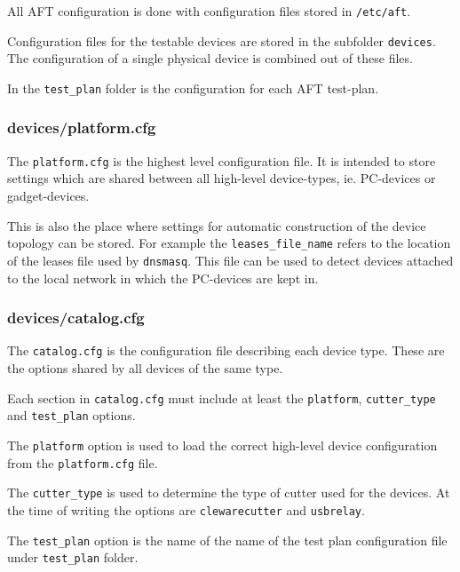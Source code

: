 \documentclass[a4paper,11pt]{article}
\newcommand{\cmd}[1]{\texttt{#1}}
\begin{document}
All AFT configuration is done with configuration files stored in \cmd{/etc/aft}.

Configuration files for the testable devices are stored in the subfolder \cmd{devices}. The configuration of a single physical device is combined out of these files.

In the \cmd{test\_plan} folder is the configuration for each AFT test-plan.

\subsubsection*{devices/platform.cfg}
The \cmd{platform.cfg} is the highest level configuration file. It is intended to store settings which are shared between all high-level device-types, ie. PC-devices or gadget-devices.

This is also the place where settings for automatic construction of the device topology can be stored. For example the \cmd{leases\_file\_name} refers to the location of the leases file used by \cmd{dnsmasq}. This file can be used to detect devices attached to the local network in which the PC-devices are kept in.

\subsubsection*{devices/catalog.cfg}
The \cmd{catalog.cfg} is the configuration file describing each device type. These are the options shared by all devices of the same type.

Each section in \cmd{catalog.cfg} must include at least the \cmd{platform}, \cmd{cutter\_type} and \cmd{test\_plan} options.

The \cmd{platform} option is used to load the correct high-level device configuration from the \cmd{platform.cfg} file. 

The \cmd{cutter\_type} is used to determine the type of cutter used for the devices. At the time of writing the options are \cmd{clewarecutter} and \cmd{usbrelay}.

The \cmd{test\_plan} option is the name of the name of the test plan configuration file under \cmd{test\_plan} folder.
\end{document}
